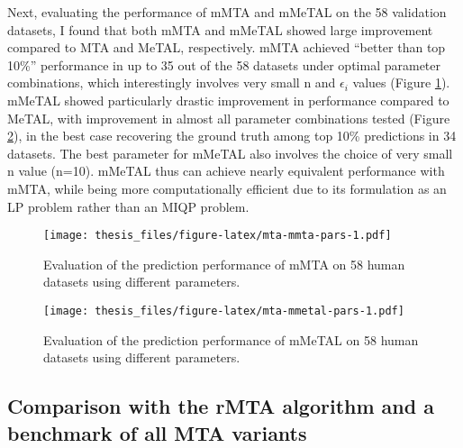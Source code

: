 \documentclass[12pt,twoside,openany,\mydriver]{thesis}  %
\begin{document}
Next, evaluating the performance of mMTA and mMeTAL on the 58 validation datasets, I found that both mMTA and mMeTAL showed large improvement compared to MTA and MeTAL, respectively. mMTA achieved ``better than top 10\%'' performance in up to 35 out of the 58 datasets under optimal parameter combinations, which interestingly involves very small n and \(\epsilon_i\) values (Figure \ref{fig:mta-mmta-pars}). mMeTAL showed particularly drastic improvement in performance compared to MeTAL, with improvement in almost all parameter combinations tested (Figure \ref{fig:mta-mmetal-pars}), in the best case recovering the ground truth among top 10\% predictions in 34 datasets. The best parameter for mMeTAL also involves the choice of very small n value (n=10). mMeTAL thus can achieve nearly equivalent performance with mMTA, while being more computationally efficient due to its formulation as an LP problem rather than an MIQP problem.
\begin{figure}
\centering
\texttt{[image: thesis\_files/figure-latex/mta-mmta-pars-1.pdf]}
\caption{\label{fig:mta-mmta-pars}Evaluation of the prediction performance of mMTA on 58 human datasets using different parameters.}
\end{figure}
\begin{figure}
\centering
\texttt{[image: thesis\_files/figure-latex/mta-mmetal-pars-1.pdf]}
\caption{\label{fig:mta-mmetal-pars}Evaluation of the prediction performance of mMeTAL on 58 human datasets using different parameters.}
\end{figure}
\hypertarget{comparison-with-the-rmta-algorithm-and-a-benchmark-of-all-mta-variants}{%
\subsection{Comparison with the rMTA algorithm and a benchmark of all MTA variants}\label{comparison-with-the-rmta-algorithm-and-a-benchmark-of-all-mta-variants}}
\end{document}
